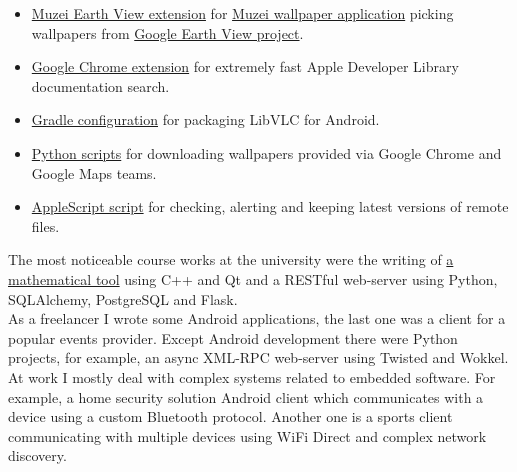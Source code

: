       \begin{itemize}

        \item \href{https://github.com/ming13/muzei-earth-view}{Muzei Earth View extension}
          for \href{http://www.muzei.co/}{Muzei wallpaper application} picking wallpapers
          from \href{http://earthview.withgoogle.com/}{Google Earth View project}.

        \item \href{https://github.com/ming13/apple-developer-library-search-extensions}{Google Chrome extension}
          for extremely fast Apple Developer Library documentation search.

        \item \href{https://github.com/ming13/libvlc-android}{Gradle configuration}
          for packaging LibVLC for Android.

        \item \href{https://github.com/ming13/google-wallpaper-downloaders}{Python scripts}
          for downloading wallpapers provided via Google Chrome and Google Maps teams.

        \item \href{https://github.com/ming13/watchdog}{AppleScript script}
          for checking, alerting and keeping latest versions of remote files.

      \end{itemize}

      The most noticeable course works at the university were the writing of
      \href{https://github.com/ming13/aequatio}{a mathematical tool}
      using C++ and Qt and a RESTful web-server using Python,
      SQLAlchemy, PostgreSQL and Flask. \\

      As a freelancer I wrote some Android applications, the last one was
      a client for a popular events provider.
      Except Android development there were Python projects, for example,
      an async XML-RPC web-server using Twisted and Wokkel. \\

      At work I mostly deal with complex systems related to embedded software.
      For example, a home security solution Android client which communicates
      with a device using a custom Bluetooth protocol. Another one is
      a sports client communicating with multiple devices using WiFi Direct
      and complex network discovery. \\

